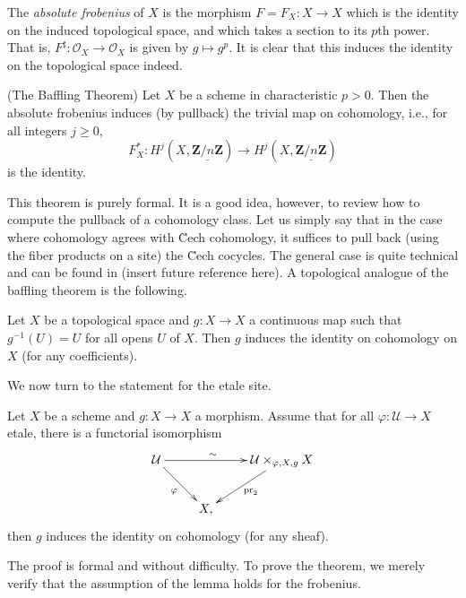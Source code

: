\begin{definition}
\label{definition-absolute-frobenius}
The {\it absolute frobenius} of $X$ is the morphism $F = F_X : X \to X$ which
is the identity on the induced topological space, and which takes a section to
its $p$th power. That is, $F^\sharp : \mathcal{O}_X \to \mathcal{O}_X$ is given
by $g \mapsto g^p$. It is clear that this induces the identity on the
topological space indeed.
\end{definition}

\begin{theorem}
\label{theorem-baffling}
(The Baffling Theorem)
Let $X$ be a scheme in characteristic $p>0$. Then the absolute frobenius
induces (by pullback) the trivial map on cohomology, i.e., for all
integers $j\geq 0$,
$$
F_X^* : H^j (X, \underline{\mathbf{Z}/n\mathbf{Z}}) \longrightarrow H^j (X,
\underline{\mathbf{Z}/n\mathbf{Z}})
$$
is the identity.
\end{theorem}

\noindent
This theorem is purely formal. It is a good idea, however, to review how to
compute the pullback of a cohomology class. Let us simply say that in the case
where cohomology agrees with \u Cech cohomology, it suffices to pull back
(using the fiber products on a site) the \u Cech cocycles. The general case is
quite technical and can be found in (insert future reference here). A
topological analogue of the baffling theorem is the following.

\begin{exercise}
\label{exercise-baffling}
Let $X$ be a topological space and $g : X \to X$ a continuous map such that
$g^{-1}(U) = U$ for all opens $U$ of $X$. Then $g$ induces the identity on
cohomology on $X$ (for any coefficients).
\end{exercise}

\noindent
We now turn to the statement for the etale site.

\begin{lemma}
\label{lemma-baffling}
Let $X$ be a scheme and $g : X \to X$ a morphism. Assume that for all $\varphi:
\mathcal{U} \to X$ etale, there is a functorial isomorphism
$$
\xymatrix{
\mathcal{U} \ar_{\varphi}[rd] \ar^{\sim \quad}[rr] && {\mathcal{U}
\times_{\varphi, X,g} X} \ar^{\text{pr}_2}[ld]\\
& X,
}
$$
then $g$ induces the identity on cohomology (for any sheaf).
\end{lemma}

\noindent
The proof is formal and without difficulty. To prove the theorem, we merely
verify that the assumption of the lemma holds for the frobenius.

